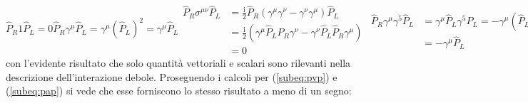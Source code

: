 \documentclass{subnucbo}
\begin{document}
\begin{subequations}
        \begin{equation}
                \hat { P } _ { R } 1  \hat { P } _ { L } = 0
                \label{subeq:psp}
        \end{equation}
        \begin{equation}
                \hat { P } _ { R } \gamma ^ { \mu } \hat { P } _ { L } = \gamma ^ { \mu } \left( \hat { P } _ { L } \right) ^ { 2 } = \gamma ^ { \mu } \hat { P } _ { L }
                \label{subeq:pvp}
        \end{equation}
        \begin{equation}
                \begin{aligned}
                        \hat { P } _ { R } \sigma ^ { \mu \nu } \hat { P } _ { L }  & = \frac { \mathrm { i } } { 2 } \hat { P } _ { R } \left( \gamma ^ { \mu } \gamma ^ { \nu } - \gamma ^ { \nu } \gamma ^ { \mu } \right) \hat { P } _ { L } \\ & = \frac { \mathrm { i } } { 2 } \left( \gamma ^ { \mu } \hat { P } _ { L } \hat { P } _ { R }  \gamma ^ { \nu } - \gamma ^ { \nu } \hat { P } _ { L } \hat { P } _ { R } \gamma ^ { \mu } \right) \\ & = 0
                \end{aligned}
                \label{subeq:ptp}
        \end{equation}
        \begin{equation}
                \begin{aligned}
                        \hat { P } _ { R } \gamma ^ { \mu } \gamma ^ { 5 } \hat { P } _ { L }  & = \gamma ^ { \mu } \hat { P } _ { L }  \gamma ^ { 5 } \hat { P } _ { L } = - \gamma ^ { \mu } \left( \hat { P } _ { L } \right) ^ { 2 } \\ & = - \gamma ^ { \mu } \hat { P } _ { L }
                \end{aligned}
                \label{subeq:pap}
        \end{equation}
        \begin{equation}
                \hat { P } _ { R } \gamma ^ { 5 } \hat { P } _ { L } = - \hat { P } _ { R } \hat { P } _ { L } = 0
                \label{subeq:ppp}
        \end{equation}
\end{subequations}
con l'evidente risultato che solo quantità vettoriali e scalari sono rilevanti nella descrizione dell'interazione debole. Proseguendo i calcoli per (\ref{subeq:pvp}) e (\ref{subeq:pap}) si vede che esse forniscono lo stesso risultato a meno di un segno:
\end{document}
